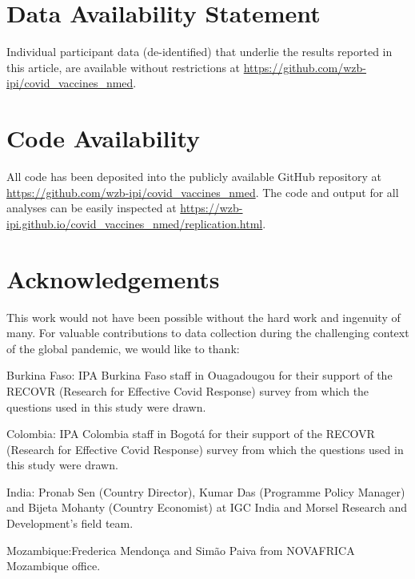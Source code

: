 \documentclass[
  12pt,
]{article}
\begin{document}
\newpage

\hypertarget{data-availability-statement}{%
\section*{Data Availability Statement}\label{data-availability-statement}}

Individual participant data (de-identified) that underlie the results reported in this article, are available without restrictions at \url{https://github.com/wzb-ipi/covid_vaccines_nmed}.

\hypertarget{code-availability}{%
\section*{Code Availability}\label{code-availability}}

All code has been deposited into the publicly available GitHub repository at \url{https://github.com/wzb-ipi/covid_vaccines_nmed}. The code and output for all analyses can be easily inspected at \url{https://wzb-ipi.github.io/covid_vaccines_nmed/replication.html}.

\hypertarget{acknowledgements}{%
\section*{Acknowledgements}\label{acknowledgements}}

This work would not have been possible without the hard work and ingenuity of many. For valuable contributions to data collection during the challenging context of the global pandemic, we would like to thank:

Burkina Faso: IPA Burkina Faso staff in Ouagadougou for their support of the RECOVR (Research for Effective Covid Response) survey from which the questions used in this study were drawn.

Colombia: IPA Colombia staff in Bogotá for their support of the RECOVR (Research for Effective Covid Response) survey from which the questions used in this study were drawn.

India: Pronab Sen (Country Director), Kumar Das (Programme Policy Manager) and Bijeta Mohanty (Country Economist) at IGC India and Morsel Research and Development's field team.

Mozambique:Frederica Mendonça and Simão Paiva from NOVAFRICA Mozambique office.
\end{document}
